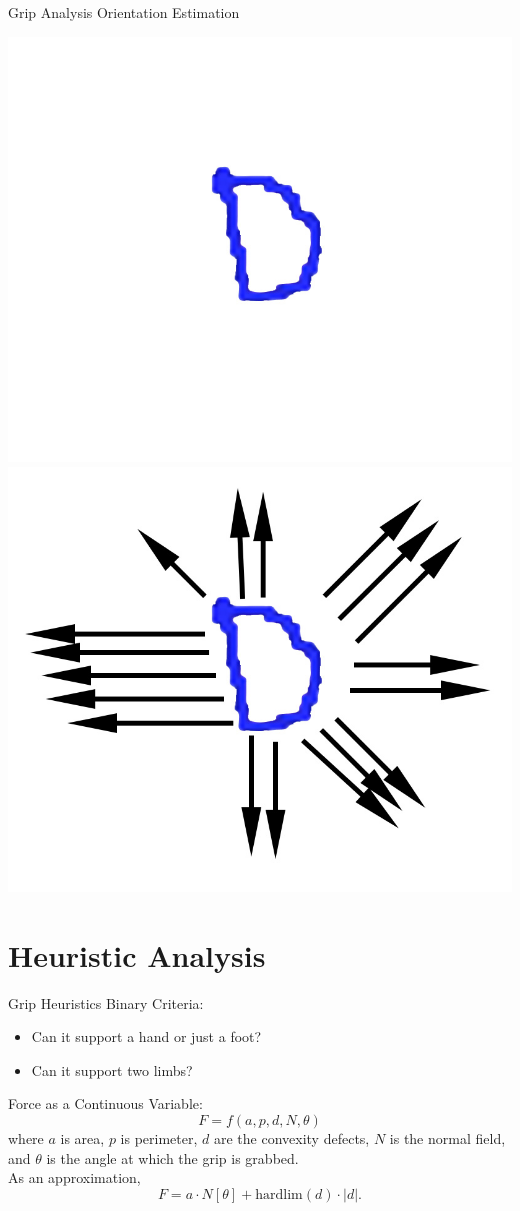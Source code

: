 \documentclass{beamer}
\begin{document}
\begin{frame}[t]{Grip Analysis}
Orientation Estimation
\begin{center}
\includegraphics[width=.45\linewidth]{img/pre_normal.jpg}  \hspace{.05cm}
\pause
\includegraphics[width=.45\linewidth]{img/normal_field.jpg}
\end{center}

\end{frame}



\section{Heuristic Analysis}
\begin{frame}[t]{Grip Heuristics}
\pause
Binary Criteria:
\begin{itemize}
 \item Can it support a hand or just a foot?
 \item Can it support two limbs?
\end{itemize}
\pause
\vspace{.3cm}
Force as a Continuous Variable:
$$
F = f(a, p, d, N, \theta)
$$
where $a$ is area, $p$ is perimeter, $d$ are the convexity defects, $N$ is the normal field, and $\theta$ is the angle at which the grip is grabbed.\\
\pause
\vspace{.3cm}
As an approximation, 
$$
F = a \cdot N[\theta] + \text{hardlim}(d) \cdot |d|.
$$
\end{frame}
\end{document}
